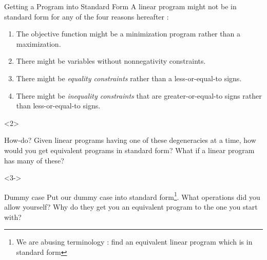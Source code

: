 \documentclass[32pt, aspectratio = 169]{beamer}
\begin{document}
\begin{frame}{Getting a Program into Standard Form}
  A linear program might not be in standard form for any of the four
  reasons hereafter :
  \begin{enumerate}
  \item The objective function might be a minimization program
    rather than a maximization.
  \item There might be variables without nonnegativity constraints.
  \item There might be \textit{equality constraints} rather than a
    less-or-equal-to signs.
  \item There might be \textit{inequality constraints} that are
    greater-or-equal-to signs rather than less-or-equal-to signs.
  \end{enumerate}
  \vspace{1em}
  \begin{overlayarea}{\textwidth}{.3\textheight}
    \begin{onlyenv}<2>
      \begin{halfshyblock}{How-do?}
        Given linear programs having one of these degeneracies at a
        time, how would you get equivalent programs in standard
        form? What if a linear program has many of these?
      \end{halfshyblock}
    \end{onlyenv}
    \begin{onlyenv}<3->
      \begin{halfshyblock}{Dummy case}
        Put our dummy case into standard form\footnote{We are abusing
          terminology : find an equivalent linear program which is in
          standard form}. What operations did you allow yourself? Why
        do they get you an equivalent program to the one you start
        with?
      \end{halfshyblock}
    \end{onlyenv}
  \end{overlayarea}
\end{frame}
\end{document}

